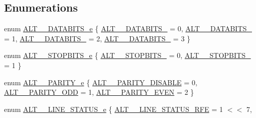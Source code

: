 \subsection*{Enumerations}
\begin{DoxyCompactItemize}
\item 
enum \mbox{\hyperlink{group__UART__LINE_ga8e9059237616c661191ac9fd517a812e}{A\+L\+T\+\_\+\_\+\+D\+A\+T\+A\+B\+I\+T\+S\+\_\+e}} \{ \mbox{\hyperlink{group__UART__LINE_gga8e9059237616c661191ac9fd517a812ea8e6dde256ccc0e00c8220d8a002d8462}{A\+L\+T\+\_\+\_\+\+D\+A\+T\+A\+B\+I\+T\+S\+\_}} = 0, 
\mbox{\hyperlink{group__UART__LINE_gga8e9059237616c661191ac9fd517a812ea2d6b0240b4c0e3bbd99186d2f450f355}{A\+L\+T\+\_\+\_\+\+D\+A\+T\+A\+B\+I\+T\+S\+\_}} = 1, 
\mbox{\hyperlink{group__UART__LINE_gga8e9059237616c661191ac9fd517a812eaecb20bdd3112cce862885c03022a2b85}{A\+L\+T\+\_\+\_\+\+D\+A\+T\+A\+B\+I\+T\+S\+\_}} = 2, 
\mbox{\hyperlink{group__UART__LINE_gga8e9059237616c661191ac9fd517a812ea17ec494b5b01b3df7a72ad04c0669d26}{A\+L\+T\+\_\+\_\+\+D\+A\+T\+A\+B\+I\+T\+S\+\_}} = 3
 \}
\item 
enum \mbox{\hyperlink{group__UART__LINE_ga737333dc2e06f30e344ca799a37c91b8}{A\+L\+T\+\_\+\_\+\+S\+T\+O\+P\+B\+I\+T\+S\+\_\+e}} \{ \mbox{\hyperlink{group__UART__LINE_gga737333dc2e06f30e344ca799a37c91b8a2f51c01895d553e022a2046f02eae7fe}{A\+L\+T\+\_\+\_\+\+S\+T\+O\+P\+B\+I\+T\+S\+\_}} = 0, 
\mbox{\hyperlink{group__UART__LINE_gga737333dc2e06f30e344ca799a37c91b8a231116c8c18bbf327691ce9a502ad652}{A\+L\+T\+\_\+\_\+\+S\+T\+O\+P\+B\+I\+T\+S\+\_}} = 1
 \}
\item 
enum \mbox{\hyperlink{group__UART__LINE_ga8ac3151dbe5902aca34e2a07ff9747b1}{A\+L\+T\+\_\+\_\+\+P\+A\+R\+I\+T\+Y\+\_\+e}} \{ \mbox{\hyperlink{group__UART__LINE_gga8ac3151dbe5902aca34e2a07ff9747b1a523b65746607f14ca2b15f5ed3f628c2}{A\+L\+T\+\_\+\_\+\+P\+A\+R\+I\+T\+Y\+\_\+\+D\+I\+S\+A\+B\+LE}} = 0, 
\mbox{\hyperlink{group__UART__LINE_gga8ac3151dbe5902aca34e2a07ff9747b1ae2df25e2765f1dd8589f50241c934101}{A\+L\+T\+\_\+\_\+\+P\+A\+R\+I\+T\+Y\+\_\+\+O\+DD}} = 1, 
\mbox{\hyperlink{group__UART__LINE_gga8ac3151dbe5902aca34e2a07ff9747b1af10a3a027c681b2fa477e8b0cb62a2e3}{A\+L\+T\+\_\+\_\+\+P\+A\+R\+I\+T\+Y\+\_\+\+E\+V\+EN}} = 2
 \}
\item 
enum \mbox{\hyperlink{group__UART__LINE_ga9bd71509496adb0f07549c10d42ff745}{A\+L\+T\+\_\+\_\+\+L\+I\+N\+E\+\_\+\+S\+T\+A\+T\+U\+S\+\_\+e}} \{ \newline
\mbox{\hyperlink{group__UART__LINE_gga9bd71509496adb0f07549c10d42ff745adf1a0232364a443d3e38a404ca891a95}{A\+L\+T\+\_\+\_\+\+L\+I\+N\+E\+\_\+\+S\+T\+A\+T\+U\+S\+\_\+\+R\+FE}} = 1 $<$$<$ 7, 
$$
\end{DoxyCompactItemize}
